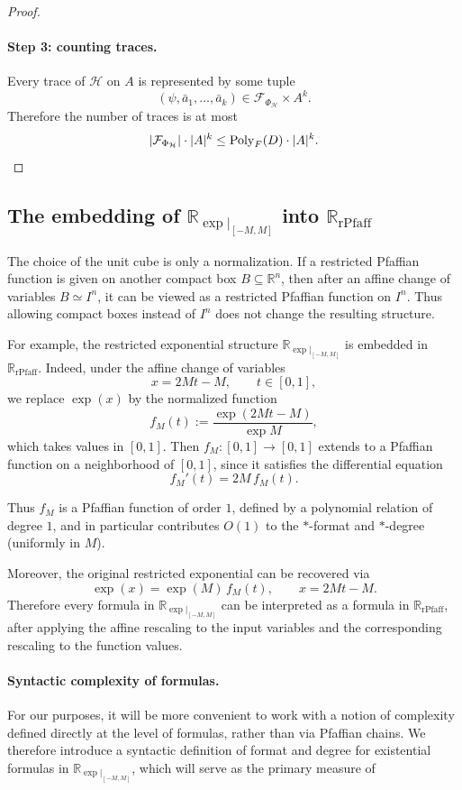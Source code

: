 \documentclass[11pt]{article}
\theoremstyle{plain}
\theoremstyle{definition}
\theoremstyle{remark}
\newcommand{\R}{\mathbb{R}}
\newcommand{\cF}{\mathcal{F}}
\newcommand{\cH}{\mathcal{H}}
\newcommand{\Poly}{\operatorname{Poly}}
\newcommand{\rPfaff}{\operatorname{rPfaff}}
\begin{document}
\begin{proof}
\paragraph{Step 3: counting traces.}
Every trace of $\cH$ on $A$ is represented by some tuple
\[
(\psi,\bar a_1,\ldots,\bar a_k)\in \cF_{\Phi_\cH}\times A^k.
\]
Therefore the number of traces is at most
\[
|\cF_{\Phi_\cH}|\cdot |A|^k \le \Poly_F(D)\cdot |A|^k. \qedhere
\]
\end{proof}

\subsection{\texorpdfstring{The embedding of \(\R_{\exp|_{[-M,M]}}\) into \(\R_{\rPfaff}\)}{The embedding of Rexp -M,M into RrPfaff}}
\label{app:embedding-exp-rPfaff}

The choice of the unit cube is only a normalization. If a restricted Pfaffian function is given on another compact box \(B\subseteq \R^n\), then after an affine change of variables \(B\simeq I^n\), it can be viewed as a restricted Pfaffian function on \(I^n\). Thus allowing compact boxes instead of \(I^n\) does not change the resulting structure.

For example, the restricted exponential structure
\(\R_{\exp|_{[-M,M]}}\) is embedded in \(\R_{\rPfaff}\).
Indeed, under the affine change of variables
\[
  x=2Mt-M,\qquad t\in[0,1],
\]
we replace \(\exp(x)\) by the normalized function
\[
  f_M(t):=\frac{\exp(2Mt-M)}{\exp M},
\]
which takes values in \([0,1]\).
Then \(f_M\colon [0,1]\to[0,1]\) extends to a Pfaffian function on a
neighborhood of \([0,1]\), since it satisfies the differential equation
\[
  f_M'(t)=2M\,f_M(t).
\]

Thus \(f_M\) is a Pfaffian function of order \(1\), defined by a polynomial
relation of degree \(1\), and in particular contributes \(O(1)\) to the
$*$-format and $*$-degree (uniformly in \(M\)).

Moreover, the original restricted exponential can be recovered via
\[
  \exp(x)=\exp(M)\, f_M(t),
  \qquad x=2Mt-M.
\]
Therefore every formula in \(\R_{\exp|_{[-M,M]}}\) can be interpreted as a
formula in \(\R_{\rPfaff}\), after applying the affine rescaling to the input
variables and the corresponding rescaling to the function values.

\paragraph{Syntactic complexity of formulas.}
For our purposes, it will be more convenient to work with a notion of
complexity defined directly at the level of formulas, rather than via
Pfaffian chains. We therefore introduce a syntactic definition of
format and degree for existential formulas in
\(\R_{\exp|_{[-M,M]}}\), which will serve as the primary measure of
\end{document}
